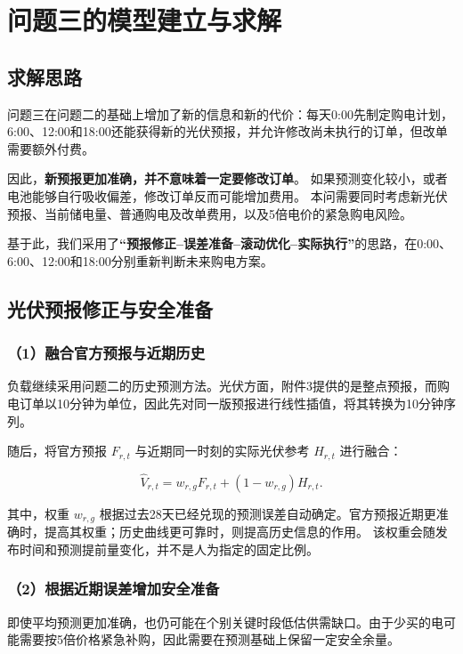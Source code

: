 \section{问题三的模型建立与求解}

\subsection{求解思路}

问题三在问题二的基础上增加了新的信息和新的代价：每天0:00先制定购电计划，
6:00、12:00和18:00还能获得新的光伏预报，并允许修改尚未执行的订单，但改单需要额外付费。

因此，\textbf{新预报更加准确，并不意味着一定要修改订单}。
如果预测变化较小，或者电池能够自行吸收偏差，修改订单反而可能增加费用。
本问需要同时考虑新光伏预报、当前储电量、普通购电及改单费用，以及5倍电价的紧急购电风险。

基于此，我们采用了\textbf{``预报修正--误差准备--滚动优化--实际执行''}的思路，在0:00、6:00、12:00和18:00分别重新判断未来购电方案。


\subsection{光伏预报修正与安全准备}

\subsubsection*{（1）融合官方预报与近期历史}

负载继续采用问题二的历史预测方法。光伏方面，附件3提供的是整点预报，而购电订单以10分钟为单位，因此先对同一版预报进行线性插值，将其转换为10分钟序列。

随后，将官方预报 $F_{r,t}$ 与近期同一时刻的实际光伏参考 $H_{r,t}$ 进行融合：

\begin{equation}
\widehat V_{r,t}
=
w_{r,g}F_{r,t}
+
(1-w_{r,g})H_{r,t}.
\end{equation}

其中，权重 $w_{r,g}$ 根据过去28天已经兑现的预测误差自动确定。官方预报近期更准确时，提高其权重；历史曲线更可靠时，则提高历史信息的作用。
该权重会随发布时间和预测提前量变化，并不是人为指定的固定比例。

\subsubsection*{（2）根据近期误差增加安全准备}

即使平均预测更加准确，也仍可能在个别关键时段低估供需缺口。由于少买的电可能需要按5倍价格紧急补购，因此需要在预测基础上保留一定安全余量。

